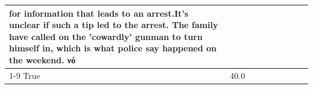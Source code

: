 \begin{table}[H]
\begin{tabular}{lllrlllll}
for information that leads to an arrest.It's unclear if such a tip led to the arrest. The family have called on the 'cowardly' gunman to turn himself in, which is what police say happened on the weekend. νό \\
\cline{1-9}
True & 40.0%
\end{tabular}
\end{table}
